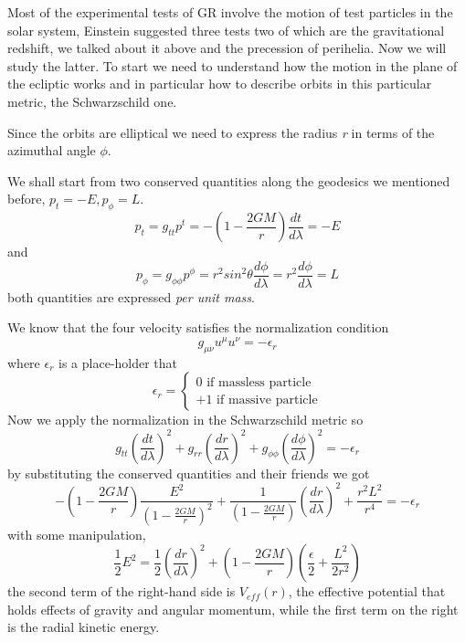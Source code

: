 Most of the experimental tests of GR involve the motion of test particles in the solar system, Einstein suggested three tests two of which are the gravitational redshift, we talked about it above and the precession of perihelia. Now we will study the latter. To start we need to understand how the motion in the plane of the ecliptic works and in particular how to describe orbits in this particular metric, the Schwarzschild one.\par
Since the orbits are elliptical we need to express the radius \emph{r} in terms of the azimuthal angle $\phi $. \par
We shall start from two conserved quantities along the geodesics we mentioned before, $p_{t} = - E, p_{\phi } = L$.
\[
p_{t } = g_{tt}p^{t} = - \left( 1- \frac{2GM}{r} \right) \frac{d t}{d \lambda } = - E
\]
and 
\[
p_{\phi } = g_{\phi \phi } p^{\phi } = r^{2} sin^{2}\theta \frac{d \phi }{d \lambda } = r^{2} \frac{d \phi }{d \lambda } = L
\]
both quantities are expressed \emph{per unit mass}.\par
We know that the four velocity satisfies the normalization condition
\[
g_{\mu \nu }u^{\mu }u^{\nu } = - \epsilon_{r}
\]
where $\epsilon_{r}$ is a place-holder that
\[
\epsilon _{r} = \begin{cases}
 0 \text{ if massless particle }\\
 +1 \text{ if massive particle}
\end{cases}
\]
Now we apply the normalization in the Schwarzschild metric so
\begin{equation}
g_{tt}\left( \frac{d t}{d \lambda } \right)^{2} + g_{rr}\left( \frac{d r}{d \lambda } \right)^{2} + g_{\phi \phi }\left( \frac{d \phi }{d \lambda } \right)^{2}  = - \epsilon_{r}
\end{equation}
by substituting the conserved quantities and their friends we got
\begin{equation}
-\left( 1- \frac{2GM}{r} \right) \frac{E^{2}}{\left( 1- \frac{2GM}{r} \right)^{2}} + \frac{1}{\left( 1 - \frac{2GM}{r} \right)}\left( \frac{d r}{d \lambda }\right)^{2} + \frac{r^{2}L^{2}}{r^{4}} = - \epsilon_{r}
\end{equation}
with some manipulation,
\begin{equation}
\frac{1}{2}E^{2} = \frac{1}{2} \left( \frac{d r}{d \lambda } \right)^{2} + \left( 1- \frac{2GM}{r} \right)\left( \frac{\epsilon }{2} + \frac{L^{2}}{2r^{2}} \right)
\end{equation}
the second term of the right-hand side is $V_{eff}\left( r \right)$, the effective potential that holds effects of gravity and angular momentum, while the first term on the right is the radial kinetic energy.

